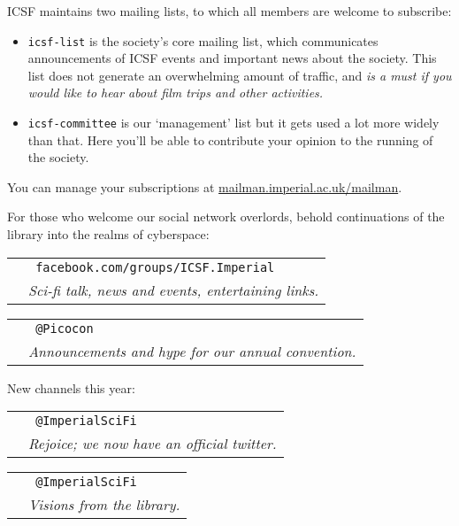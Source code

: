 %
ICSF maintains two mailing lists, to which all members are welcome to subscribe:

\begin{itemize}
\item \texttt{icsf-list} is the society’s core mailing list, which communicates announcements of ICSF events and important news about the society. This list does not generate an overwhelming amount of traffic, and \textit{is a must if you would like to hear about film trips and other activities.}

\item \texttt{icsf-committee} is our ‘management’ list \textemdash{} but it gets used a lot more widely than that. Here you’ll be able to contribute your opinion to the running of the society.
\end{itemize}

\noindent%
You can manage your subscriptions at \url{mailman.imperial.ac.uk/mailman}.

%
For those who welcome our social network overlords, behold continuations of the library into the realms of cyberspace:

\newcommand{\socialmedia}[3]{
  \begin{tabular}{r l}
    \multirow{2}{*}{\LARGE {#1}}
    & \texttt{#2} \\
    & \textit{#3}
  \end{tabular}
}

\socialmedia{\faFacebookOfficial}{
  facebook.com/groups/ICSF.Imperial
}{
  Sci-fi talk, news and events, entertaining links.
}


\socialmedia{\faTwitter}{
  @Picocon
}{
  Announcements and hype for our annual convention.
}

\noindent New channels this year:

\socialmedia{\faTwitter}{
  @Imperial\textunderscore SciFi
}{
  Rejoice; we now have an official twitter.
}

\socialmedia{\faInstagram}{
  @Imperial\textunderscore SciFi
}{
  Visions from the library.
}
